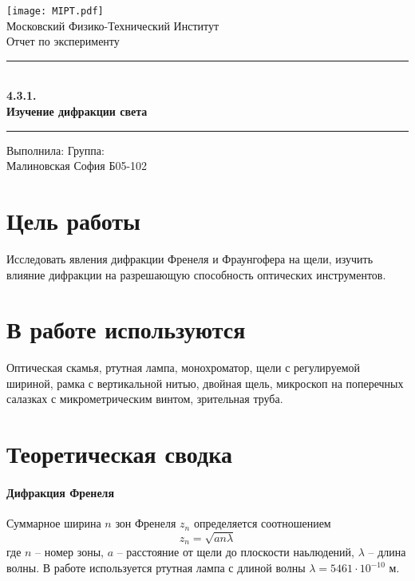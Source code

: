 \documentclass[a4paper,12pt]{article}
\begin{document}
\begin{titlepage}
		\vspace*{\fill}
		
		\begin{center}
			\texttt{[image: MIPT.pdf]}
			\\[0.7cm]\Huge Московский Физико-Технический Институт
			\\[2cm]\LARGE Отчет по эксперименту
			\\[0.5cm]\noindent\rule{\textwidth}{1pt}
			\\\Huge\textbf{4.3.1.\\ Изучение дифракции света}
			\\[-0.5cm]\noindent\rule{\textwidth}{1pt}
		\end{center}
		
		\vspace*{\fill}
		
		\begin{flushleft}
			Выполнила: \hspace{\fill} Группа:
			\\Малиновская София \hspace{\fill} Б05-102
		\end{flushleft}
	\end{titlepage}

	\setcounter{page}{2}


\section*{Цель работы} 
Исследовать явления дифракции Френеля и Фраунгофера на щели, изучить влияние дифракции на разрешающую способность оптических инструментов.


\section*{В работе используются}
Оптическая скамья, ртутная лампа, монохроматор, щели с регулируемой шириной, рамка с вертикальной нитью, двойная щель, микроскоп на поперечных салазках с микрометрическим винтом, зрительная труба.


\section*{Теоретическая сводка}
\paragraph{Дифракция Френеля}
Суммарное ширина $n$ зон Френеля $z_n$ определяется соотношением 
\begin{equation}
    z_n = \sqrt{an\lambda}
\end{equation}
где $n$ -- номер зоны, $a$ -- расстояние от щели до плоскости наьлюдений, $\lambda$ -- длина волны. В работе используется ртутная лампа с длиной волны $\lambda = 5461 \cdot 10^{-10}$ м.
\end{document}
